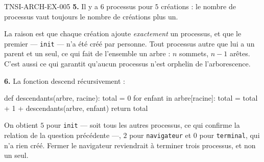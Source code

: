 \begin{corrige}{TNSI-ARCH-EX-005}
\textbf{5.} Il y a $6$ processus pour $5$ créations : le nombre de processus
vaut toujours le nombre de créations plus un.

La raison est que chaque création ajoute \emph{exactement} un processus, et que
le premier — \lstinline{init} — n'a été créé par personne. Tout processus autre
que lui a un parent et un seul, ce qui fait de l'ensemble un arbre : $n$ sommets,
$n-1$ arêtes. C'est aussi ce qui garantit qu'aucun processus n'est orphelin de
l'arborescence.

\textbf{6.} La fonction descend récursivement :
\begin{python}
def descendants(arbre, racine):
    total = 0
    for enfant in arbre[racine]:
        total = total + 1 + descendants(arbre, enfant)
    return total
\end{python}
On obtient $5$ pour \lstinline{init} — soit tous les autres processus, ce qui
confirme la relation de la question précédente —, $2$ pour
\lstinline{navigateur} et $0$ pour \lstinline{terminal}, qui n'a rien créé.
Fermer le navigateur reviendrait à terminer trois processus, et non un seul.
\end{corrige}
